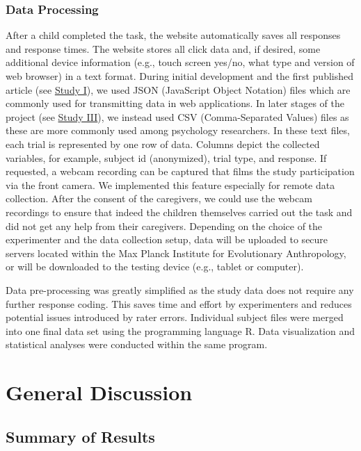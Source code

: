 \documentclass[
]{scrbook}
\begin{document}
\subsection{Data Processing}\label{data-processing}

After a child completed the task, the website automatically saves all responses and response times. The website stores all click data and, if desired, some additional device information (e.g., touch screen yes/no, what type and version of web browser) in a text format. During initial development and the first published article (see \hyperref[studyI]{Study I}), we used JSON (JavaScript Object Notation) files which are commonly used for transmitting data in web applications. In later stages of the project (see \hyperref[studyIII]{Study III}), we instead used CSV (Comma-Separated Values) files as these are more commonly used among psychology researchers. In these text files, each trial is represented by one row of data. Columns depict the collected variables, for example, subject id (anonymized), trial type, and response. If requested, a webcam recording can be captured that films the study participation via the front camera. We implemented this feature especially for remote data collection. After the consent of the caregivers, we could use the webcam recordings to ensure that indeed the children themselves carried out the task and did not get any help from their caregivers. Depending on the choice of the experimenter and the data collection setup, data will be uploaded to secure servers located within the Max Planck Institute for Evolutionary Anthropology, or will be downloaded to the testing device (e.g., tablet or computer).

Data pre-processing was greatly simplified as the study data does not require any further response coding. This saves time and effort by experimenters and reduces potential issues introduced by rater errors. Individual subject files were merged into one final data set using the programming language R. Data visualization and statistical analyses were conducted within the same program.

\chapter{General Discussion}\label{discussion}

\section{Summary of Results}\label{summary-of-results}
\end{document}

